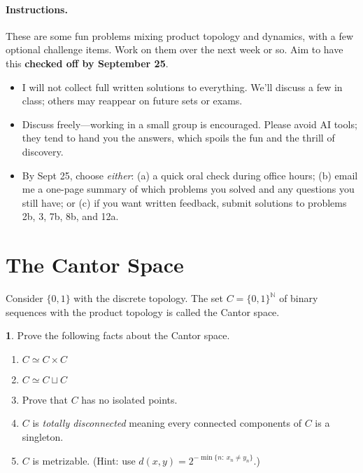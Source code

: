\documentclass[11pt]{article}
\theoremstyle{definition}
\newtheorem{problem}{}
\newcommand{\bp}{\begin{problem}}
\newcommand{\ep}{\end{problem}\bigskip}
\theoremstyle{theorem}
\begin{document}
\pagestyle{fancy}
\fancyfoot[R,C,L]{}

\newcommand{\Top}{\mathbf{Top}}
\newcommand{\Set}{\mathbf{Set}}
\newcommand{\N}{\mathbb{N}}

\paragraph{Instructions.}
These are some fun problems mixing product topology and dynamics, with a few optional challenge items. Work on them over the next week or so.  Aim to have this \textbf{checked off by September 25}.

\begin{itemize}
\item I will not collect full written solutions to everything. We’ll discuss a few in class; others may reappear on future sets or exams.
\item Discuss freely—working in a small group is encouraged. Please avoid AI tools; they tend to hand you the answers, which spoils the fun and the thrill of discovery.
\item By Sept 25, choose \emph{either}: (a) a quick oral check during office hours; (b) email me a one-page summary of which problems you solved and any questions you still have; or (c) if you want written feedback, submit solutions to problems 2b, 3, 7b, 8b, and 12a.
\end{itemize}

\section*{The Cantor Space}

Consider $\{0,1\}$ with the discrete topology.  The set $C=\{0,1\}^\N$ of binary sequences with the product topology is called the Cantor space.

\bp Prove the following facts about the Cantor space.
\begin{enumerate}[label=(\alph*)]
\item $C\simeq C\times C$
\item $C\simeq C \sqcup C$
\item Prove that $C$ has no isolated points.
\item $C$ is \emph{totally disconnected} meaning every connected components of $C$ is a singleton.
\item $C$ is metrizable.  (Hint: use $d(x,y)=2^{-\min\{n:\ x_n\ne y_n\}}$.)
\end{enumerate}
\ep
\end{document}
